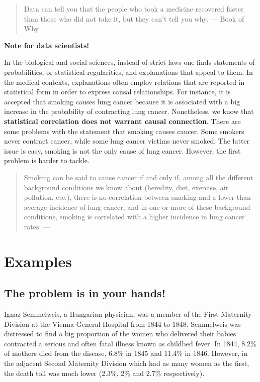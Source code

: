 \documentclass[
]{book}
\begin{document}
\begin{quote}
Data can tell you that the people who took a medicine recovered faster than those who did not take it, but they can't tell you why. --- Book of Why
\end{quote}

\begin{tipbox}

\textbf{Note for data scientists!}

In the biological and social sciences, instead of strict laws one finds statements of probabilities, or statistical regularities, and explanations that appeal to them. In the medical contexts, explanations often employ relations that are reported in statistical form in order to express causal relationships. For instance, it is accepted that smoking causes lung cancer because it is associated with a big increase in the probability of contracting lung cancer. Nonetheless, we know that \textbf{statistical correlation does not warrant causal connection}. There are some problems with the statement that smoking causes cancer. Some smokers never contract cancer, while some lung cancer victims never smoked. The latter issue is easy, smoking is not the only cause of lung cancer. However, the first problem is harder to tackle.

\begin{quote}
Smoking can be said to cause cancer if and only if, among all the different background conditions we know about (heredity, diet, exercise, air pollution, etc.), there is no correlation between smoking and a lower than average incidence of lung cancer, and in one or more of these background conditions, smoking is correlated with a higher incidence in lung cancer rates. --- \citep{rosenberg2019philosophy}
\end{quote}

\end{tipbox}

\hypertarget{examples-1}{%
\section{Examples}\label{examples-1}}

\hypertarget{semmelweis}{%
\subsection{The problem is in your hands!}\label{semmelweis}}

Ignaz Semmelweis, a Hungarian physician, was a member of the First Maternity Division at the Vienna General Hospital from 1844 to 1848. Semmelweis was distressed to find a big proportion of the women who delivered their babies contracted a serious and often fatal illness known as childbed fever. In 1844, 8.2\% of mothers died from the disease, 6.8\% in 1845 and 11.4\% in 1846. However, in the adjacent Second Maternity Division which had as many women as the first, the death toll was much lower (2.3\%, 2\% and 2.7\% respectively).
\end{document}
